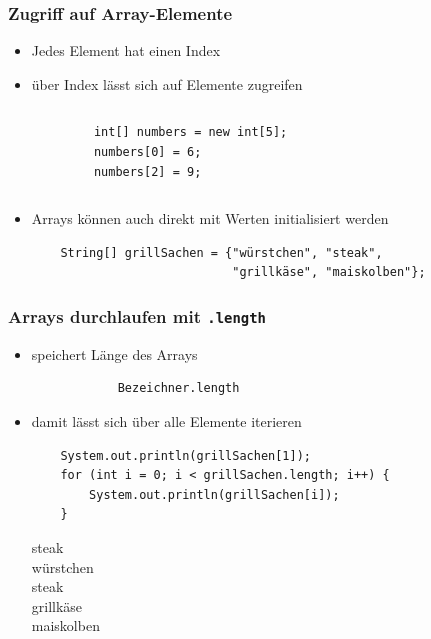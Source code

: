 \documentclass{../../presentation}
\begin{document}
\begin{frame}[fragile]
	\frametitle{Zugriff auf Array-Elemente}
	\begin{itemize}
		\item\pause Jedes Element hat einen Index
		\item\pause über Index lässt sich auf Elemente zugreifen
	\end{itemize}
	\begin{columns}
		\begin{verbatim}
            int[] numbers = new int[5];
            numbers[0] = 6;
            numbers[2] = 9;
        \end{verbatim}

		\begin{center}
		\end{center}
	\end{columns}

	\vspace{0.5cm}
	\begin{itemize}
		\item\pause Arrays können auch direkt mit Werten initialisiert werden
		      \begin{verbatim}
    String[] grillSachen = {"würstchen", "steak", 
                            "grillkäse", "maiskolben"};
    \end{verbatim}
	\end{itemize}
\end{frame}

\begin{frame}[fragile]
	\frametitle{Arrays durchlaufen mit \texttt{.length}}
	\begin{itemize}
		\item\pause speichert Länge des Arrays
		      \begin{verbatim}
			Bezeichner.length
		\end{verbatim}
		\item\pause damit lässt sich über alle Elemente iterieren
		      \begin{verbatim}
    System.out.println(grillSachen[1]);
    for (int i = 0; i < grillSachen.length; i++) {
        System.out.println(grillSachen[i]);
    }
    \end{verbatim}
		      \begin{ausgabe}
			      steak \\
			      würstchen \\
			      steak \\
			      grillkäse \\
			      maiskolben
		      \end{ausgabe}
	\end{itemize}
\end{frame}
\end{document}
